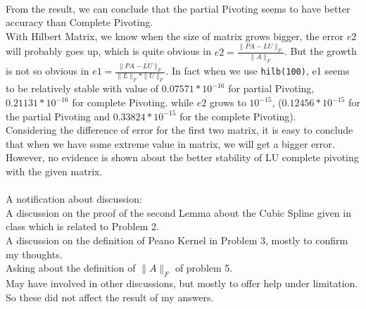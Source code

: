 \documentclass[12pt]{article}
\begin{document}
\begin{enumerate}
\begin{enumerate}
\\
From the result, we can conclude that the partial Pivoting seems to have better accuracy than Complete Pivoting. \\
With Hilbert Matrix, we know when the size of matrix grows bigger, the error $e2$ will probably goes up, which is quite obvious in $e2=\frac{\| PA - LU \|_{F}}{\| A \|_F}$. But the growth is not so obvious in $e1=\frac{\| PA - LU \|_{F}}{\| L \|_F*\| U\|_F}$. In fact when we use \texttt{hilb(100)}, e1 seems to be relatively stable with value of $0.07571*10^{-16}$ for partial Pivoting, $0.21131*10^{-16}$ for complete Pivoting. while $e2$ grows to $10^{-15}$, ($0.12456*10^{-15}$ for the partial Pivoting and $0.33824*10^{-15}$ for the complete Pivoting).\\
Considering the difference of error for the first two matrix, it is easy to conclude that when we have some extreme value in matrix, we will get a bigger error. \\
However, no evidence is shown about the better stability of LU complete pivoting with the given matrix.\\
\\
A notification about discussion:\\
A discussion on the proof of the second Lemma about the Cubic Spline given in class which is related to Problem 2.\\
A discussion on the definition of Peano Kernel in Problem 3, mostly to confirm my thoughts.\\
Asking about the definition of $\|A\|_F$ of problem 5.\\
May have involved in other discussions, but mostly to offer help under limitation. So these did not affect the result of my answers.\\
\end{enumerate}

\end{enumerate}
\end{document}
